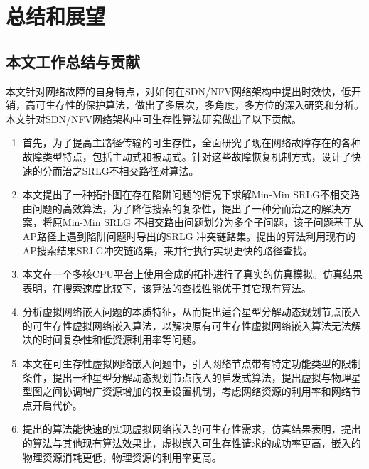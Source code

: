 
\chapter*{总结和展望}
\section{本文工作总结与贡献}
本文针对网络故障的自身特点，对如何在SDN/NFV网络架构中提出时效快，低开销，高可生存性的保护算法，做出了多层次，多角度，多方位的深入研究和分析。本文针对SDN/NFV网络架构中可生存性算法研究做出了以下贡献。
\begin{enumerate}
  \item 首先，为了提高主路径传输的可生存性，全面研究了现在网络故障存在的各种故障类型特点，包括主动式和被动式。针对这些故障恢复机制方式，设计了快速的分而治之SRLG不相交路径对算法。
  \item 本文提出了一种拓扑图在存在陷阱问题的情况下求解Min-Min SRLG不相交路由问题的高效算法，为了降低搜索的复杂性，提出了一种分而治之的解决方案，将原Min-Min SRLG 不相交路由问题划分为多个子问题，该子问题基于从AP路径上遇到陷阱问题时导出的SRLG 冲突链路集。提出的算法利用现有的AP搜索结果SRLG冲突链路集，来并行执行实现更快的路径查找。
  \item 本文在一个多核CPU平台上使用合成的拓扑进行了真实的仿真模拟。仿真结果表明，在搜索速度比较下，该算法的查找性能优于其它现有算法。
  \item 分析虚拟网络嵌入问题的本质特征，从而提出适合星型分解动态规划节点嵌入的可生存性虚拟网络嵌入算法，以解决原有可生存性虚拟网络嵌入算法无法解决的时间复杂性和低资源利用率等问题。
  \item 本文在可生存性虚拟网络嵌入问题中，引入网络节点带有特定功能类型的限制条件，提出一种星型分解动态规划节点嵌入的启发式算法，提出虚拟与物理星型图之间协调增广资源增加的权重设置机制，考虑网络资源的利用率和网络节点开启代价。
  \item   提出的算法能快速的实现虚拟网络嵌入的可生存性需求，仿真结果表明，提出的算法与其他现有算法效果比，虚拟嵌入可生存性请求的成功率更高，嵌入的物理资源消耗更低，物理资源的利用率更高。
\end{enumerate}



